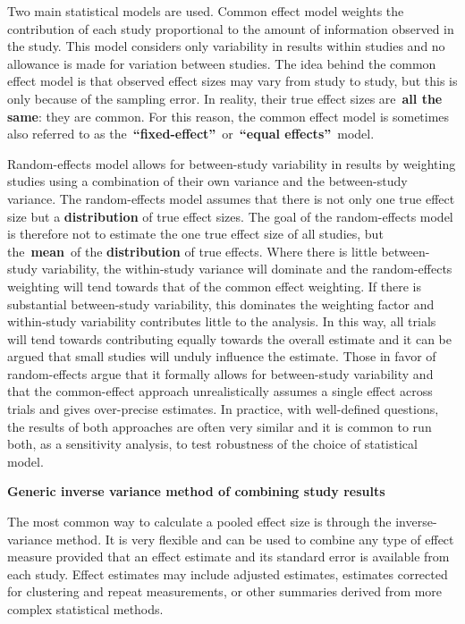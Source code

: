 \documentclass[
  10pt,
  a4paper,
  DIV=11,
  numbers=noendperiod]{scrreprt}
\begin{document}
Two main statistical models are used. Common effect model weights the
contribution of each study proportional to the amount of information
observed in the study. This model considers only variability in results
within studies and no allowance is made for variation between studies.
The idea behind the common effect model is that observed effect sizes
may vary from study to study, but this is only because of the sampling
error. In reality, their true effect sizes are~\textbf{all the same}:
they are common. For this reason, the common effect model is sometimes
also referred to as the~\textbf{``fixed-effect''}~or~\textbf{``equal
effects''}~model.

Random-effects model allows for between-study variability in results by
weighting studies using a combination of their own variance and the
between-study variance. The random-effects model assumes that there is
not only one true effect size but a \textbf{distribution} of true effect
sizes. The goal of the random-effects model is therefore not to estimate
the one true effect size of all studies, but the~\textbf{mean}~of the
\textbf{distribution} of true effects. Where there is little
between-study variability, the within-study variance will dominate and
the random-effects weighting will tend towards that of the common effect
weighting. If there is substantial between-study variability, this
dominates the weighting factor and within-study variability contributes
little to the analysis. In this way, all trials will tend towards
contributing equally towards the overall estimate and it can be argued
that small studies will unduly influence the estimate. Those in favor of
random-effects argue that it formally allows for between-study
variability and that the common-effect approach unrealistically assumes
a single effect across trials and gives over-precise estimates. In
practice, with well-defined questions, the results of both approaches
are often very similar and it is common to run both, as a sensitivity
analysis, to test robustness of the choice of statistical model.

\textbf{Generic inverse variance method of combining study results}

The most common way to calculate a pooled effect size is through the
inverse-variance method. It is very flexible and can be used to combine
any type of effect measure provided that an effect estimate and its
standard error is available from each study. Effect estimates may
include adjusted estimates, estimates corrected for clustering and
repeat measurements, or other summaries derived from more complex
statistical methods.
\end{document}
